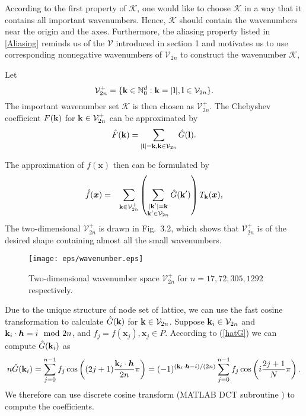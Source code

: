 \documentclass[article]{siamltex}
\def\bx{\boldsymbol x}
\def\bk{{\bf k}}
\def\bh{{\boldsymbol h}}
\def\bl{{\bf l}}
\def\calV {\mathcal {V}}
\def\K {\mathcal {K}}
\newcommand{\N}{\mathbb{N}}
\newcommand{\dsum}{\displaystyle\sum}
\begin{document}
 According to the first property  of ${\K}$, one would like to
choose ${{\K}}$ in a way that it contains all important wavenumbers.
Hence, ${\K}$ should contain the wavenumbers near the origin and the
axes. Furthermore, the aliasing property listed in
\eqref{Aliasing} reminds us of the $\calV$ introduced in section 1
and motivates us to use corresponding nonnegative wavenumbers of $\calV_{2n}$
to construct the wavenumber ${\K}$,



Let
$${\calV}_{2n}^{+}=\{ \bk\in{\N}_0^d: \bk=|\bl|, \bl\in  {\calV}_{2n}\}.$$ 
The important wavenumber set $\K$ is then chosen as ${\calV}_{2n}^{+}$. The Chebyshev coefficient $F(\bk)$ for $\bk \in {\calV}_{2n}^{+}$ can be approximated by $$\hat{F}(\bk)=\sum_{|\bl|=\bk,\\\bk\in {\calV}_{2n}}\hat{G}(\bl).$$

The approximation of $f(\bx)$  then can be formulated by
\begin{eqnarray}\label{fhat1}
\hat{f}(\bx)
&=& \dsum_{\bk\in {\calV}_{2n}^+}\left(\dsum_{\substack{|\bk'|=\bk\\\bk'\in {\calV}_{2n}}}\hat{G}(\bk')\right)T_{\bk}(\bx),
\end{eqnarray}
The
two-dimensional ${\calV}_{2n}^+$ is drawn in Fig.~3.2, which shows
that ${\calV}_{2n}^+$ is of the desired shape containing almost
all the small wavenumbers.

\begin{figure}[ht]\label{wvnK^+}
\begin{center}
\texttt{[image: eps/wavenumber.eps]}
\caption{Two-dimensional wavenumber space ${\calV}_{2n}^+$ for
$n=17,72,305,1292$ respectively.}
\end{center}
\end{figure}

Due to the unique structure of node set of lattice, we can use the fast cosine transformation to calculate $\hat{G}(\bk)$ for $\bk \in {\cal V}_{2n}$.
Suppose $\bk_i \in {\cal V}_{2n}$ and $\bk_i\cdot\bh = i \mod 2n$, and $f_j={f}(\bx_j),\bx_j \in P.$
According to (\ref{hatG}) we can compute $\hat{G}(\bk_i)$ as
\begin{equation*}
n\hat{G}(\bk_i)=\mathop \sum \limits_{j = 0}^{n-1}  f_j \cos \left((2j+1)\frac{\bk_i\cdot\bh}
{{2n}}\pi \right)=(-1)^{(\bk_i\cdot\bh - i)/(2n) } \mathop \sum \limits_{j = 0}^{n-1}  f_j \cos \left(i\frac{{2j + 1}}
{{N}}\pi \right).
\end{equation*}
We therefore can use discrete cosine transform (MATLAB DCT subroutine ) to compute the coefficients.
\end{document}
